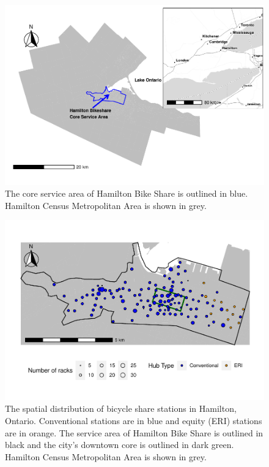 \documentclass[]{elsarticle} %
\begin{document}
\begin{figure}

{\centering \includegraphics[width=0.9\linewidth]{Bike-share-spatial-equity_files/figure-latex/hamilton-and-sobi-service-area-1} 

}

\caption{The core service area of Hamilton Bike Share is outlined in blue. Hamilton Census Metropolitan Area is shown in grey.}\label{fig:hamilton-and-sobi-service-area}
\end{figure}

\begin{figure}

{\centering \includegraphics[width=1\linewidth]{Bike-share-spatial-equity_files/figure-latex/sobi-stations-in-hamilton-1} 

}

\caption{The spatial distribution of bicycle share stations in Hamilton, Ontario. Conventional stations are in blue and equity (ERI) stations are in orange. The service area of Hamilton Bike Share is outlined in black and the city's downtown core is outlined in dark green. Hamilton Census Metropolitan Area is shown in grey.}\label{fig:sobi-stations-in-hamilton}
\end{figure}
\end{document}
